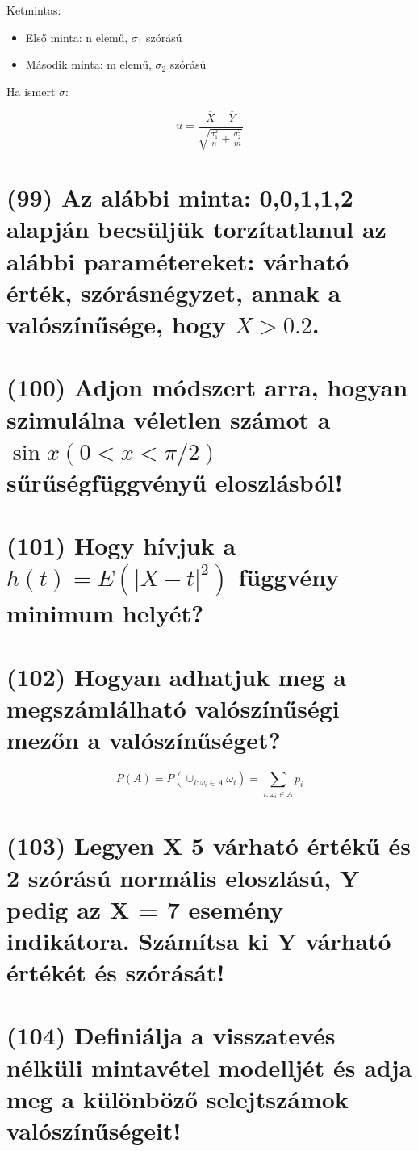 \documentclass[12p]{article}
\begin{document}
Ketmintas:
\begin{itemize}
	\item Első minta: n elemű, $\sigma_1$ szórású
	\item Második minta: m elemű, $\sigma_2$ szórású
\end{itemize}

Ha ismert $\sigma$:

$$u = \frac{\overline{X} - \overline{Y}}{\sqrt{\frac{\sigma^2_1}{n} + \frac{\sigma^2_2}{m}}}$$

\section{(99) Az alábbi minta: 0,0,1,1,2 alapján becsüljük torzítatlanul az alábbi paramétereket:
várható érték, szórásnégyzet, annak a valószínűsége, hogy $X > 0.2$.}

\section{(100) Adjon módszert arra, hogyan szimulálna véletlen számot a $\sin x (0 < x < \pi/2)$ sűrűségfüggvényű eloszlásból!}

\section{(101) Hogy hívjuk a $h(t) = E(|X - t|^2)$ függvény minimum helyét?}

\section{(102) Hogyan adhatjuk meg a megszámlálható valószínűségi mezőn a valószínűséget?}

$$P(A) = P(\cup_{i:\omega_i \in A} \omega_i) = \sum_{i:\omega_i \in A} p_i$$

\section{(103) Legyen X 5 várható értékű és 2 szórású normális eloszlású, Y pedig az X = 7 esemény indikátora. Számítsa ki Y várható értékét és szórását!}

\section{(104)  Definiálja a visszatevés nélküli mintavétel modelljét és adja meg a különböző selejtszámok valószínűségeit!}
\end{document}
